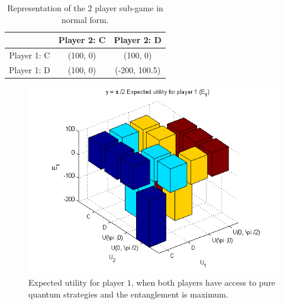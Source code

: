 \documentclass[10pt,twocolumn]{llncs}
\begin{document}
\begin{table}[h]
\begin{center}
\begin{centering}
\begin{tabular}{ccc}
\hline 
  & Player 2: C & Player 2: D\tabularnewline
\hline 
Player 1: C & (100, 0) & (100, 0)\tabularnewline
Player 1: D & (100, 0) & (-200, 100.5)\tabularnewline
\hline 
\end{tabular}

\par\end{centering}
\caption{Representation of the $2$ player sub-game in normal form.}
\label{tab:classico2jogadores_analise}
\end{center}
\end{table}

\begin{figure}[h!]
\centering 
\includegraphics[scale=0.60]{Figures/1.5qubit/p2_E1.png}
\caption{Expected utility for player $1$, when both players have access to pure quantum strategies and the entanglement is maximum. }
\label{fig:pg_2players_99_0_1:1}
\end{figure}
\end{document}
